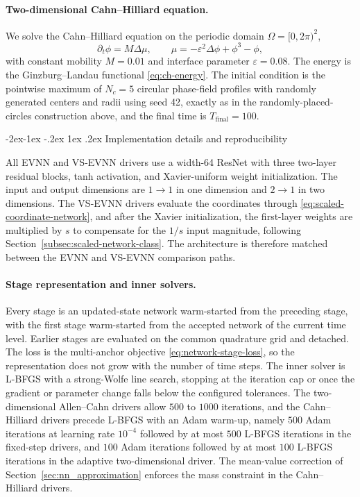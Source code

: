 \documentclass[11pt,letterpaper]{article}
\makeatletter
\theoremstyle{plain}
\theoremstyle{definition}
\renewcommand\subsubsection{\@startsection{subsubsection}{3}{\z@}%
                                     {-2ex\@plus -1ex \@minus -.2ex}%
                                     {1ex \@plus .2ex}%
                                     {\normalfont\normalsize\bfseries}}
\makeatother
\begin{document}
\paragraph{Two-dimensional Cahn--Hilliard equation.} We solve the Cahn--Hilliard equation on the periodic domain $\Omega=[0,2\pi)^2$,
\begin{equation}
\partial_t\phi = M\Delta\mu,
\qquad
\mu = -\varepsilon^2\Delta\phi + \phi^3 - \phi,
\end{equation}
with constant mobility $M=0.01$ and interface parameter $\varepsilon=0.08$. The energy is the Ginzburg--Landau functional \eqref{eq:ch-energy}. The initial condition is the pointwise maximum of $N_c=5$ circular phase-field profiles with randomly generated centers and radii using seed 42, exactly as in the randomly-placed-circles construction above, and the final time is $T_{\text{final}}=100$.


\subsubsection{Implementation details and reproducibility}
\label{subsec:implementation}


All EVNN and VS-EVNN drivers use a width-64 ResNet with three two-layer residual blocks, tanh activation, and Xavier-uniform weight initialization. The input and output dimensions are $1\to1$ in one dimension and $2\to1$ in two dimensions. The VS-EVNN drivers evaluate the coordinates through \eqref{eq:scaled-coordinate-network}, and after the Xavier initialization, the first-layer weights are multiplied by $s$ to compensate for the $1/s$ input magnitude, following Section~\ref{subsec:scaled-network-class}. The architecture is therefore matched between the EVNN and VS-EVNN comparison paths.


\paragraph{Stage representation and inner solvers.} Every stage is an updated-state network warm-started from the preceding stage, with the first stage warm-started from the accepted network of the current time level. Earlier stages are evaluated on the common quadrature grid and detached. The loss is the multi-anchor objective \eqref{eq:network-stage-loss}, so the representation does not grow with the number of time steps. The inner solver is L-BFGS with a strong-Wolfe line search, stopping at the iteration cap or once the gradient or parameter change falls below the configured tolerances. The two-dimensional Allen--Cahn drivers allow $500$ to $1000$ iterations, and the Cahn--Hilliard drivers precede L-BFGS with an Adam warm-up, namely $500$ Adam iterations at learning rate $10^{-4}$ followed by at most $500$ L-BFGS iterations in the fixed-step drivers, and $100$ Adam iterations followed by at most $100$ L-BFGS iterations in the adaptive two-dimensional driver. The mean-value correction of Section~\ref{sec:nn_approximation} enforces the mass constraint in the Cahn--Hilliard drivers.
\end{document}
